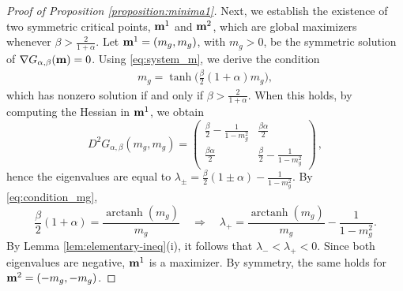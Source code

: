 \documentclass[11pt,oneside]{amsart}
\numberwithin{equation}{section}  %
\theoremstyle{plain}
\theoremstyle{remark}
\def \bm {{\bf m}}
\begin{document}
\begin{proof}[Proof of Proposition \ref{proposition:minima1}]
Next, we establish the existence of two symmetric critical points, $\bm^1$ and $\bm^2$, which are global maximizers whenever $\beta > \frac{2}{1+\alpha}$. Let $\bm^1=(m_g,m_g)$, with $m_g>0$, be the symmetric solution of $\nabla G_{\alpha,\beta}(\bm)=0$. Using \eqref{eq:system_m}, we derive the condition
\begin{align}\label{eq:condition_mg}
    m_g=\tanh\!\Big(\frac{\beta}{2}(1+\alpha)m_g\Big),
\end{align}
which has nonzero solution if and only if $\beta > \frac{2}{1+\alpha}$. When this holds, by computing the Hessian in $\bm^1$, we obtain
$$   D^2G_{\alpha,\beta}( m_g, m_g)=
\begin{pmatrix}
        \frac{\beta}{2}-\frac{1}{1-m_g^2} & \frac{\beta \alpha}{2} \\
        \frac{\beta \alpha}{2} & \frac{\beta}{2}-\frac{1}{1-m_g^2}
    \end{pmatrix}\,,
    $$
hence the eigenvalues are equal to $\lambda_{\pm}=\frac{\beta}{2} (1\pm \alpha)-\frac{1}{1-m_g^2}$.
By \eqref{eq:condition_mg},
$$
    \frac{\beta}{2}(1+\alpha)=\frac{\operatorname{arctanh}(m_g)}{m_g} \quad \Longrightarrow\quad
    \lambda_+=\frac{\operatorname{arctanh}(m_g)}{m_g}-\frac{1}{1-m_g^2}.
$$
By Lemma \ref{lem:elementary-ineq}(i), it follows that $\lambda_-<\lambda_+<0$. 
Since both eigenvalues are negative, $\bm^1$ is a maximizer. By symmetry, the same holds for $\bm^2=(-m_g,-m_g)$.


\end{proof}
\end{document}
